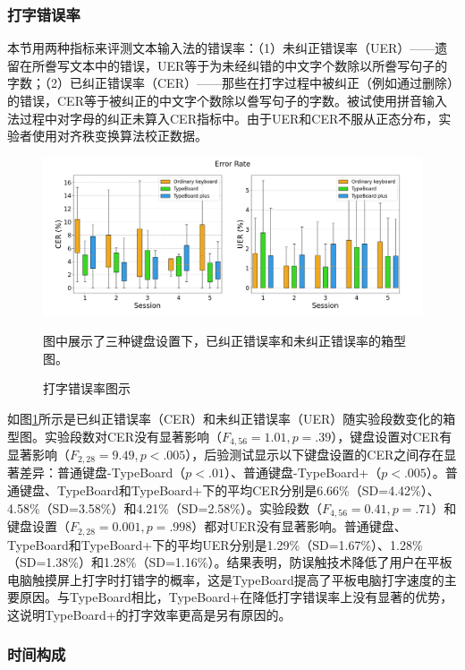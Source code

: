\subsubsection{打字错误率}

本节用两种指标来评测文本输入法的错误率：（1）未纠正错误率（UER）——遗留在所誊写文本中的错误，UER等于为未经纠错的中文字个数除以所誊写句子的字数；（2）已纠正错误率（CER）——那些在打字过程中被纠正（例如通过删除）的错误，CER等于被纠正的中文字个数除以誊写句子的字数。被试使用拼音输入法过程中对字母的纠正未算入CER指标中。由于UER和CER不服从正态分布，实验者使用对齐秩变换算法\cite{2011-Aligned}校正数据。

\begin{figure}[!tbh]
	\includegraphics[width=1.0\linewidth]{figures/TypeBoard_error_rate.png}
	\centering
	\caption*{图中展示了三种键盘设置下，已纠正错误率和未纠正错误率的箱型图。}
	\caption{打字错误率图示}
	\label{fig:TypeBoard_error_rate}
\end{figure}

如图\ref{fig:TypeBoard_error_rate}所示是已纠正错误率（CER）和未纠正错误率（UER）随实验段数变化的箱型图。实验段数对CER没有显著影响（$F_{4,56}=1.01,p=.39$），键盘设置对CER有显著影响（$F_{2,28}=9.49,p<.005$），后验测试显示以下键盘设置的CER之间存在显著差异：普通键盘-TypeBoard（$p<.01$）、普通键盘-TypeBoard+（$p<.005$）。普通键盘、TypeBoard和TypeBoard+下的平均CER分别是6.66\%（SD=4.42\%）、4.58\%（SD=3.58\%）和4.21\%（SD=2.58\%）。实验段数（$F_{4,56}=0.41,p=.71$）和键盘设置（$F_{2,28}=0.001,p=.998$）都对UER没有显著影响。普通键盘、TypeBoard和TypeBoard+下的平均UER分别是1.29\%（SD=1.67\%）、1.28\%（SD=1.38\%）和1.28\%（SD=1.16\%）。结果表明，防误触技术降低了用户在平板电脑触摸屏上打字时打错字的概率，这是TypeBoard提高了平板电脑打字速度的主要原因。与TypeBoard相比，TypeBoard+在降低打字错误率上没有显著的优势，这说明TypeBoard+的打字效率更高是另有原因的。

\subsubsection{时间构成}

